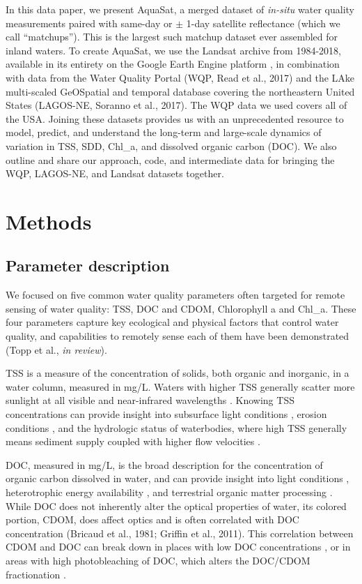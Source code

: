 \documentclass[draft,linenumbers]{agujournal2018}
\begin{document}
In this data paper, we present AquaSat, a merged dataset of
\emph{in-situ} water quality measurements paired with same-day or
\(\pm\) 1-day satellite reflectance (which we call ``matchups''). This
is the largest such matchup dataset ever assembled for inland waters. To
create AquaSat, we use the Landsat archive from 1984-2018, available in
its entirety on the Google Earth Engine platform \citep{Gorelick2017},
in combination with data from the Water Quality Portal (WQP, Read et
al., 2017) and the LAke multi-scaled GeOSpatial and temporal database
covering the northeastern United States (LAGOS-NE, Soranno et al.,
2017). The WQP data we used covers all of the USA. Joining these
datasets provides us with an unprecedented resource to model, predict,
and understand the long-term and large-scale dynamics of variation in
TSS, SDD, Chl\_a, and dissolved organic carbon (DOC). We also outline
and share our approach, code, and intermediate data for bringing the
WQP, LAGOS-NE, and Landsat datasets together.

\section{Methods}

\subsection{Parameter description}

We focused on five common water quality parameters often targeted for
remote sensing of water quality: TSS, DOC and CDOM, Chlorophyll a and
Chl\_a. These four parameters capture key ecological and physical
factors that control water quality, and capabilities to remotely sense
each of them have been demonstrated (Topp et al., \emph{in review}).

TSS is a measure of the concentration of solids, both organic and
inorganic, in a water column, measured in mg/L. Waters with higher TSS
generally scatter more sunlight at all visible and near-infrared
wavelengths \citep{Ritchie1976}. Knowing TSS concentrations can provide
insight into subsurface light conditions \citep{Julian2008}, erosion
conditions \citep{Syvitski2011}, and the hydrologic status of
waterbodies, where high TSS generally means sediment supply coupled with
higher flow velocities \citep{Williams1989,Pavelsky2009}.

DOC, measured in mg/L, is the broad description for the concentration of
organic carbon dissolved in water, and can provide insight into light
conditions \citep{Vahatalo2005}, heterotrophic energy availability
\citep{Robbins2017}, and terrestrial organic matter processing
\citep{Williamson2008}. While DOC does not inherently alter the optical
properties of water, its colored portion, CDOM, does affect optics and
is often correlated with DOC concentration
\citep{Bricaud1981,Griffin2011} (Bricaud et al., 1981; Griffin et al.,
2011). This correlation between CDOM and DOC can break down in places
with low DOC concentrations \citep{Griffin2018}, or in areas with high
photobleaching of DOC, which alters the DOC/CDOM fractionation
\citep{Spencer2009,Cory2015}.
\end{document}
